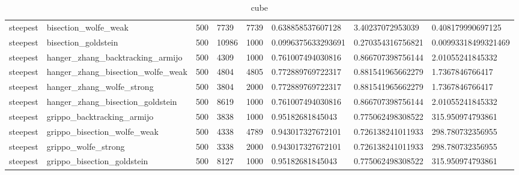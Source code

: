 \documentclass[a4paper,11pt]{article}
\numberwithin{equation}{section} %
\begin{document}
\begin{table}[h!]
{\begin{tabular}{|l|l|l|l|l|l|l|l|}
        steepest & bisection\_wolfe\_weak & 500 & 7739 & 7739 & 0.638858537607128 & 3.40237072953039 & 0.408179990697125 \\
        steepest & bisection\_goldstein & 500 & 10986 & 1000 & 0.0996375633293691 & 0.270354316756821 & 0.00993318499321469 \\
        steepest & hanger\_zhang\_backtracking\_armijo & 500 & 4309 & 1000 & 0.761007494030816 & 0.866707398756144 & 2.01055241845332 \\
        steepest & hanger\_zhang\_bisection\_wolfe\_weak & 500 & 4804 & 4805 & 0.772889769722317 & 0.881541965662279 & 1.7367846766417 \\
        steepest & hanger\_zhang\_wolfe\_strong & 500 & 3804 & 2000 & 0.772889769722317 & 0.881541965662279 & 1.7367846766417 \\
        steepest & hanger\_zhang\_bisection\_goldstein & 500 & 8619 & 1000 & 0.761007494030816 & 0.866707398756144 & 2.01055241845332 \\
        steepest & grippo\_backtracking\_armijo & 500 & 3838 & 1000 & 0.95182681845043 & 0.775062498308522 & 315.950974793861 \\
        steepest & grippo\_bisection\_wolfe\_weak & 500 & 4338 & 4789 & 0.943017327672101 & 0.726138241011933 & 298.780732356955 \\
        steepest & grippo\_wolfe\_strong & 500 & 3338 & 2000 & 0.943017327672101 & 0.726138241011933 & 298.780732356955 \\
        steepest & grippo\_bisection\_goldstein & 500 & 8127 & 1000 & 0.95182681845043 & 0.775062498308522 & 315.950974793861 \\

\end{tabular}}
\caption{cube}
\label{table:cube}
\end{table}
\end{document}
